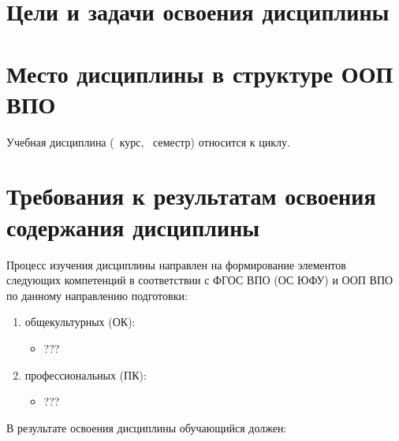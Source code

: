 






\section{Цели и задачи освоения дисциплины}

\section{Место дисциплины в структуре ООП ВПО}


	\ssect Учебная дисциплина \thecourse{}
(\theyearofstudy~курс, \theterm~семестр) относится к 
циклу.

	\ssect %

	\ssect %

\section{Требования к результатам освоения содержания дисциплины}

	\ssect
Процесс изучения дисциплины направлен на формирование элементов следующих компетенций в соответствии с ФГОС ВПО (ОС ЮФУ) и ООП ВПО по данному направлению подготовки:

\begin{enumerate}
\makeatletter
\makeatother
\renewcommand{\labelenumi}{\asbuk{enumi})}

	\item общекультурных (ОК):
	\begin{itemize}
		\item ???
	\end{itemize}

	\item профессиональных (ПК):
	\begin{itemize}
		\item ???
	\end{itemize}
\end{enumerate}

В результате освоения дисциплины обучающийся должен:

